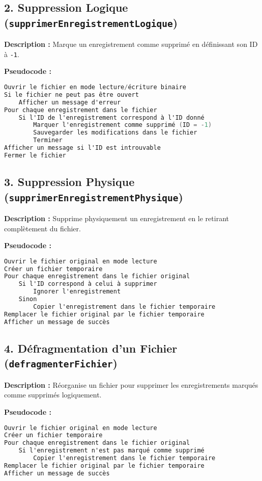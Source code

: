 \documentclass{article}
\begin{document}
\subsection*{2. Suppression Logique (\texttt{supprimerEnregistrementLogique})}
\textbf{Description :} Marque un enregistrement comme supprimé en définissant son ID à \texttt{-1}.

\textbf{Pseudocode :}
\begin{lstlisting}[language=C, caption={Pseudocode pour \texttt{supprimerEnregistrementLogique}}]
Ouvrir le fichier en mode lecture/écriture binaire
Si le fichier ne peut pas être ouvert
    Afficher un message d'erreur
Pour chaque enregistrement dans le fichier
    Si l'ID de l'enregistrement correspond à l'ID donné
        Marquer l'enregistrement comme supprimé (ID = -1)
        Sauvegarder les modifications dans le fichier
        Terminer
Afficher un message si l'ID est introuvable
Fermer le fichier
\end{lstlisting}

\subsection*{3. Suppression Physique (\texttt{supprimerEnregistrementPhysique})}
\textbf{Description :} Supprime physiquement un enregistrement en le retirant complètement du fichier.

\textbf{Pseudocode :}
\begin{lstlisting}[language=C, caption={Pseudocode pour \texttt{supprimerEnregistrementPhysique}}]
Ouvrir le fichier original en mode lecture
Créer un fichier temporaire
Pour chaque enregistrement dans le fichier original
    Si l'ID correspond à celui à supprimer
        Ignorer l'enregistrement
    Sinon
        Copier l'enregistrement dans le fichier temporaire
Remplacer le fichier original par le fichier temporaire
Afficher un message de succès
\end{lstlisting}

\subsection*{4. Défragmentation d'un Fichier (\texttt{defragmenterFichier})}
\textbf{Description :} Réorganise un fichier pour supprimer les enregistrements marqués comme supprimés logiquement.

\textbf{Pseudocode :}
\begin{lstlisting}[language=C, caption={Pseudocode pour \texttt{defragmenterFichier}}]
Ouvrir le fichier original en mode lecture
Créer un fichier temporaire
Pour chaque enregistrement dans le fichier original
    Si l'enregistrement n'est pas marqué comme supprimé
        Copier l'enregistrement dans le fichier temporaire
Remplacer le fichier original par le fichier temporaire
Afficher un message de succès
\end{lstlisting}
\end{document}
